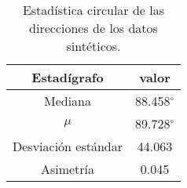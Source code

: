 \begin{table}[H]
	\centering
	\begin{tabular}{ |c|c|}
		\hline
		Estad\'igrafo         &  valor   \\ \hline\hline
		Mediana             & 88.458$^{\circ}$ \\ \hline
		$\mu$              & 89.728$^{\circ}$ \\ \hline
		Desviaci\'on est\'andar &  44.063  \\ \hline
		Asimetr\'ia           &  0.045   \\ \hline
	\end{tabular}
	\caption{Estad\'istica circular de las direcciones de los datos sint\'eticos.}
	\label{t:circStats}
\end{table}

